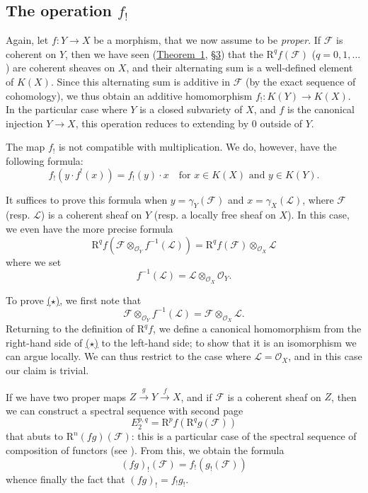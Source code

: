 \documentclass{article}
\theoremstyle{plain}
\theoremstyle{definition}
\newcommand{\scr}[1]{{\mathscr{#1}}}
\newcommand{\RR}{\mathrm{R}}
\newcommand{\oldpage}[1]{\marginpar{\footnotesize$\Big\vert$ \textit{p.~#1}}}
\begin{document}
\subsection{The operation \texorpdfstring{$f_!$}{f_!}}
\label{subsection5d}

Again, let $f\colon Y\to X$ be a morphism, that we now assume to be \emph{proper}.
If $\scr{F}$ is coherent on $Y$, then we have seen (\hyperref[theorem1]{Theorem~1}, \hyperref[section3]{\S3}) that the $\RR^qf(\scr{F})$ ($q=0,1,\ldots$) are coherent sheaves on $X$, and their alternating sum is a well-defined element of $K(X)$.
Since this alternating sum is additive in $\scr{F}$ (by the exact sequence of cohomology), we thus obtain an additive homomorphism $f_!\colon K(Y)\to K(X)$.
In the particular case where $Y$ is a closed subvariety of $X$, and $f$ is the canonical injection $Y\to X$, this operation reduces to extending by $0$ outside of $Y$.

The map $f_!$ is not compatible with multiplication.
We do, however, have the following formula:
\[
  f_!(y\cdot f^!(x)) = f_!(y)\cdot x
  \quad
  \mbox{for $x\in K(X)$ and $y\in K(Y)$.}
\]

It suffices to prove this formula when $y=\gamma_Y(\scr{F})$ and $x=\gamma_X(\scr{L})$, where $\scr{F}$ (resp. $\scr{L}$) is a coherent sheaf on $Y$ (resp. a locally free sheaf on $X$).
In this case, we even have the more precise formula
\[
\label{equation*}
  \RR^qf(\scr{F}\otimes_{\scr{O}_Y}f^{-1}(\scr{L})) = \RR^qf(\scr{F})\otimes_{\scr{O}_X}\scr{L}
  \tag{$\star$}
\]
where we set
\[
  f^{-1}(\scr{L}) = \scr{L}\otimes_{\scr{O}_X}\scr{O}_Y.
\]

\oldpage{111}
To prove \hyperref[equation*]{($\star$)}, we first note that
\[
  \scr{F}\otimes_{\scr{O}_Y}f^{-1}(\scr{L}) = \scr{F}\otimes_{\scr{O}_X}\scr{L}.
\]
Returning to the definition of $\RR^qf$, we define a canonical homomorphism from the right-hand side of \hyperref[equation*]{($\star$)} to the left-hand side;
to show that it is an isomorphism we can argue locally.
We can thus restrict to the case where $\scr{L}=\scr{O}_X$, and in this case our claim is trivial.

If we have two proper maps $Z\xrightarrow{g}Y\xrightarrow{f}X$, and if $\scr{F}$ is a coherent sheaf on $Z$, then we can construct a spectral sequence with second page
\[
  E_2^{p,q} = \RR^pf(\RR^qg(\scr{F}))
\]
that abuts to $\RR^n(fg)(\scr{F})$:
this is a particular case of the spectral sequence of composition of functors (see \cite{7}).
From this, we obtain the formula
\[
  (fg)_!(\scr{F}) = f_!(g_!(\scr{F}))
\]
whence finally the fact that $(fg)_!=f_!g_!$.
\end{document}
